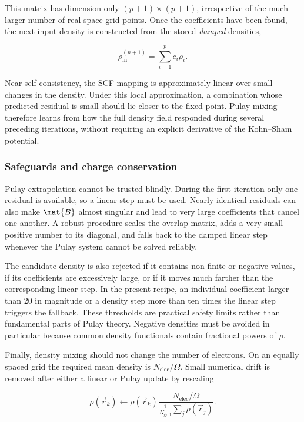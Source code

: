 This matrix has dimension only \((p+1)\times(p+1)\), irrespective of the much larger number of real-space grid points. Once the coefficients have been found, the next input density is constructed from the stored \emph{damped} densities,

\begin{equation}
    \rho_{\text{in}}^{(n+1)}
    =\sum_{i=1}^{p}c_i\bar{\rho}_i.
    \label{eq:pulay-update}
\end{equation}

Near self-consistency, the SCF mapping is approximately linear over small changes in the density. Under this local approximation, a combination whose predicted residual is small should lie closer to the fixed point. Pulay mixing therefore learns from how the full density field responded during several preceding iterations, without requiring an explicit derivative of the Kohn--Sham potential.

\subsubsection{Safeguards and charge conservation}

Pulay extrapolation cannot be trusted blindly. During the first iteration only one residual is available, so a linear step must be used. Nearly identical residuals can also make \(\mat{B}\) almost singular and lead to very large coefficients that cancel one another. A robust procedure scales the overlap matrix, adds a very small positive number to its diagonal, and falls back to the damped linear step whenever the Pulay system cannot be solved reliably.

The candidate density is also rejected if it contains non-finite or negative values, if its coefficients are excessively large, or if it moves much farther than the corresponding linear step. In the present recipe, an individual coefficient larger than 20 in magnitude or a density step more than ten times the linear step triggers the fallback. These thresholds are practical safety limits rather than fundamental parts of Pulay theory. Negative densities must be avoided in particular because common density functionals contain fractional powers of \(\rho\).

Finally, density mixing should not change the number of electrons. On an equally spaced grid the required mean density is \(N_{\text{elec}}/\Omega\). Small numerical drift is removed after either a linear or Pulay update by rescaling

\begin{equation}
    \rho(\vec{r}_k)\leftarrow
    \rho(\vec{r}_k)
    \frac{N_{\text{elec}}/\Omega}
    {\frac{1}{N_{\text{grid}}}\sum_j\rho(\vec{r}_j)}.
    \label{eq:density-normalization}
\end{equation}

